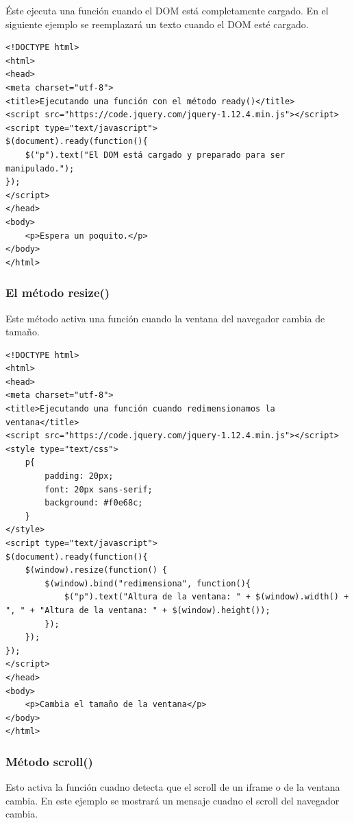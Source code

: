 \documentclass[11pt]{article}
\begin{document}
Éste ejecuta una función cuando el DOM está completamente cargado. En el siguiente ejemplo se reemplazará un texto cuando el DOM esté cargado.

\begin{verbatim}
<!DOCTYPE html>
<html>
<head>
<meta charset="utf-8">
<title>Ejecutando una función con el método ready()</title>
<script src="https://code.jquery.com/jquery-1.12.4.min.js"></script>
<script type="text/javascript">
$(document).ready(function(){
    $("p").text("El DOM está cargado y preparado para ser manipulado.");
});
</script>
</head>
<body>
    <p>Espera un poquito.</p>
</body>
</html>                                		
\end{verbatim}

\subsubsection*{El método resize()}
\label{sec:orgf6a4c8b}

Este método activa una función cuando la ventana del navegador cambia de tamaño.

\begin{verbatim}
<!DOCTYPE html>
<html>
<head>
<meta charset="utf-8">
<title>Ejecutando una función cuando redimensionamos la ventana</title>
<script src="https://code.jquery.com/jquery-1.12.4.min.js"></script>
<style type="text/css">
    p{
        padding: 20px;
        font: 20px sans-serif;
        background: #f0e68c;
    }
</style>
<script type="text/javascript">
$(document).ready(function(){
    $(window).resize(function() {
        $(window).bind("redimensiona", function(){ 
            $("p").text("Altura de la ventana: " + $(window).width() + ", " + "Altura de la ventana: " + $(window).height());
        });
    });
});
</script>
</head> 
<body>
    <p>Cambia el tamaño de la ventana</p>
</body>
</html>     
\end{verbatim}

\subsubsection*{Método scroll()}
\label{sec:orgbfc0422}

Esto activa la función cuadno detecta que el scroll de un iframe o de la ventana cambia. En este ejemplo se mostrará un mensaje cuadno el scroll del navegador cambia.
\end{document}
